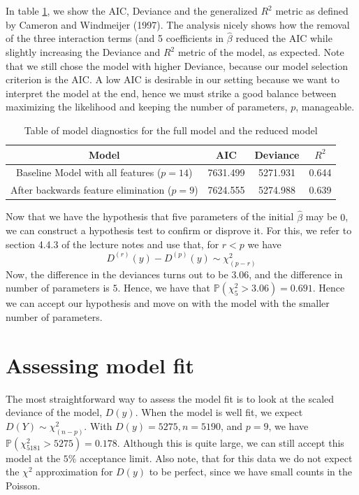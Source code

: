 \documentclass[a4paper,11pt]{article}
\begin{document}
In table \ref{tab:backwards_elimination}, we show the AIC, Deviance and the generalized $R^2$ metric as defined by Cameron and Windmeijer (1997). The analysis nicely shows how the removal of the three interaction terms (and 5 coefficients in $\hat{\beta}$ reduced the AIC while slightly increasing the Deviance and $R^2$ metric of the model, as expected. Note that we still chose the model with higher Deviance, because our model selection criterion is the AIC. A low AIC is desirable in our setting because we want to interpret the model at the end, hence we must strike a good balance between maximizing the likelihood and keeping the number of parameters, $p$, manageable.

\begin{table}[h]
    \centering
    \begin{tabular}{|c|c|c|c|}
    \hline
    Model & AIC & Deviance & $R^2$\\
    \hline
    Baseline Model with all features ($p=14$) &  7631.499 & 5271.931 & 0.644\\
    After backwards feature elimination ($p=9$) & 7624.555 & 5274.988  & 0.639\\
        \hline
        
    \end{tabular}
    \caption{Table of model diagnostics for the full model and the reduced model}
    \label{tab:backwards_elimination}
\end{table}

Now that we have the hypothesis that five parameters of the initial $\hat{\beta}$ may be $0$, we can construct a hypothesis test to confirm or disprove it. For this, we refer to section 4.4.3 of the lecture notes and use that, for $r<p$ we have
\begin{equation}
D^{(r)}(y) - D^{(p)}(y) \sim \chi^2_{(p-r)}
\end{equation}
Now, the difference in the deviances turns out to be $3.06$, and the difference in number of parameters is $5$. Hence, we have that $\mathbb{P}( \chi^2_{5} > 3.06) = 0.691$. Hence we can accept our hypothesis and move on with the model with the smaller number of parameters.

\section{Assessing model fit}
The most straightforward way to assess the model fit is to look at the scaled deviance of the model, $D(y)$. When the model is well fit, we expect $D(Y) \sim \chi^2_{(n-p)}$. With $D(y) = 5275, n = 5190$, and $p=9$, we have $\mathbb{P}( \chi^2_{5181} > 5275) = 0.178$. Although this is quite large, we can still accept this model at the $5\%$ acceptance limit. Also note, that for this data we do not expect the $\chi^2$ approximation for $D(y)$ to be perfect, since we have small counts in the Poisson.
\end{document}
